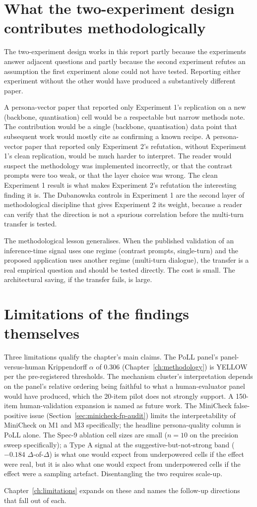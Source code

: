 \section{What the two-experiment design contributes methodologically}

The two-experiment design works in this report partly because the experiments answer adjacent questions and partly because the second experiment refutes an assumption the first experiment alone could not have tested. Reporting either experiment without the other would have produced a substantively different paper.

A persona-vector paper that reported only Experiment 1's replication on a new (backbone, quantisation) cell would be a respectable but narrow methods note. The contribution would be a single (backbone, quantisation) data point that subsequent work would mostly cite as confirming a known recipe. A persona-vector paper that reported only Experiment 2's refutation, without Experiment 1's clean replication, would be much harder to interpret. The reader would suspect the methodology was implemented incorrectly, or that the contrast prompts were too weak, or that the layer choice was wrong. The clean Experiment 1 result is what makes Experiment 2's refutation the interesting finding it is. The Dubanowska controls in Experiment 1 are the second layer of methodological discipline that gives Experiment 2 its weight, because a reader can verify that the direction is not a spurious correlation before the multi-turn transfer is tested.

The methodological lesson generalises. When the published validation of an inference-time signal uses one regime (contrast prompts, single-turn) and the proposed application uses another regime (multi-turn dialogue), the transfer is a real empirical question and should be tested directly. The cost is small. The architectural saving, if the transfer fails, is large.

\section{Limitations of the findings themselves}

Three limitations qualify the chapter's main claims. The PoLL panel's panel-versus-human Krippendorff $\alpha$ of 0.306 (Chapter~\ref{ch:methodology}) is YELLOW per the pre-registered thresholds. The mechanism cluster's interpretation depends on the panel's relative ordering being faithful to what a human-evaluator panel would have produced, which the 20-item pilot does not strongly support. A 150-item human-validation expansion is named as future work. The MiniCheck false-positive issue (Section~\ref{sec:minicheck-fp-audit}) limits the interpretability of MiniCheck on M1 and M3 specifically; the headline persona-quality column is PoLL alone. The Spec-9 ablation cell sizes are small ($n = 10$ on the precision sweep specifically); a Type A signal at the suggestive-but-not-strong band ($-0.184$ $\Delta$-of-$\Delta$) is what one would expect from underpowered cells if the effect were real, but it is also what one would expect from underpowered cells if the effect were a sampling artefact. Disentangling the two requires scale-up.

Chapter~\ref{ch:limitations} expands on these and names the follow-up directions that fall out of each.
